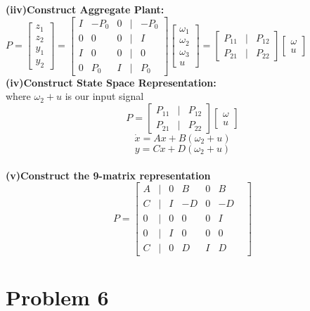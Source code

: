 \documentclass[10pt,a4paper]{article}
\begin{document}
\begin{tcolorbox}
\textbf{(iiv)Construct Aggregate Plant:} \\
$P=\begin{bmatrix}
z_1\\z_2\\y_1\\y_2
\end{bmatrix}=\begin{bmatrix}
I& -P_0 & 0& |& -P_0\\
0& 0& 0& |& I\\
\hline
I& 0& 0& |& 0\\
0& P_0& I& |& P_0
\end{bmatrix}\begin{bmatrix}
\omega_1\\\omega_2\\\omega_3\\u
\end{bmatrix} =\begin{bmatrix}
P_{11}& |& P_{12}\\
\hline
P_{21}& |&P_{22}
\end{bmatrix}\begin{bmatrix}
\omega\\u
\end{bmatrix}$\\

\textbf{(iv)Construct State Space Representation:} \\
where $\omega_2 +u$ is our input signal\\
$$P=\begin{bmatrix}
P_{11}& |& P_{12}\\
\hline
P_{21}& |&P_{22}
\end{bmatrix}\begin{bmatrix}
\omega\\u
\end{bmatrix}$$
$$\dot{x}=Ax+B(\omega_2 +u)$$
$$y=Cx+D(\omega_2 +u)$$\\
\textbf{(v)Construct the 9-matrix representation}
$$P=\begin{bmatrix}
A& |& 0& B& 0& B&\\
\hline
C& |& I& -D& 0& -D\\ 
0& |& 0& 0& 0& I\\
0& |& I& 0& 0& 0\\
C& |& 0& D& I& D

\end{bmatrix}
$$

\end{tcolorbox}

\section{Problem 6}
\end{document}
